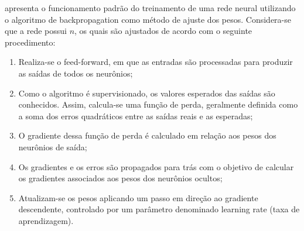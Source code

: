          apresenta o funcionamento padrão do treinamento de uma rede neural utilizando o algoritmo 
        de backpropagation como método de ajuste dos pesos. Considera-se que a rede possui \( n\),  os quais são 
        ajustados de acordo com o seguinte procedimento:
        \begin{enumerate}
            \item Realiza-se o feed-forward, em que as entradas são processadas para produzir as saídas de todos os neurônios;
            \item Como o algoritmo é supervisionado, os valores esperados das saídas são conhecidos. Assim, calcula-se uma função de perda, geralmente definida como a soma dos erros quadráticos entre as saídas reais e as esperadas;
            \item O gradiente dessa função de perda é calculado em relação aos pesos dos neurônios de saída;
            \item Os gradientes e os erros são propagados para trás com o objetivo de calcular os gradientes associados aos pesos dos neurônios ocultos;
            \item Atualizam-se os pesos aplicando um passo em direção ao gradiente descendente, controlado por um parâmetro denominado learning rate (taxa de aprendizagem).
        \end{enumerate}